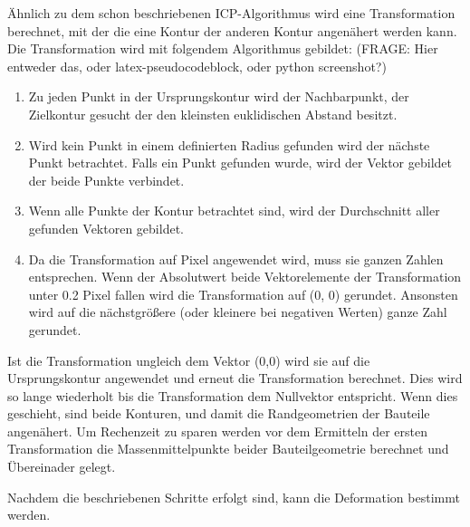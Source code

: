 Ähnlich zu dem schon beschriebenen ICP-Algorithmus wird eine Transformation berechnet,
mit der die eine Kontur der anderen Kontur angenähert werden kann.
Die Transformation wird mit folgendem Algorithmus gebildet:
(FRAGE: Hier entweder das, oder latex-pseudocodeblock, oder python screenshot?)
\begin{enumerate}
    \item Zu jeden Punkt in der Ursprungskontur wird der Nachbarpunkt,
    der Zielkontur gesucht der den kleinsten euklidischen Abstand besitzt.
    \item Wird kein Punkt in einem definierten Radius gefunden wird der nächste Punkt
    betrachtet. Falls ein Punkt gefunden wurde, wird der Vektor gebildet der beide Punkte
    verbindet.
    \item Wenn alle Punkte der Kontur betrachtet sind, wird der Durchschnitt aller gefunden
    Vektoren gebildet.
    \item Da die Transformation auf Pixel angewendet wird, muss sie ganzen Zahlen 
    entsprechen. Wenn der Absolutwert beide Vektorelemente der Transformation 
    unter 0.2 Pixel fallen wird die Transformation auf (0, 0) gerundet. 
    Ansonsten wird auf die nächstgrößere (oder kleinere bei negativen Werten) ganze 
    Zahl gerundet.
\end{enumerate}

Ist die Transformation ungleich dem Vektor (0,0) wird sie auf die Ursprungskontur 
angewendet und erneut die Transformation berechnet. Dies wird so lange wiederholt bis 
die Transformation dem Nullvektor entspricht. Wenn dies geschieht, sind beide Konturen, 
und damit die Randgeometrien der Bauteile angenähert.
Um Rechenzeit zu sparen werden vor dem Ermitteln der ersten Transformation die 
Massenmittelpunkte beider Bauteilgeometrie berechnet und Übereinader gelegt.

Nachdem die beschriebenen Schritte erfolgt sind, kann die Deformation bestimmt werden.
